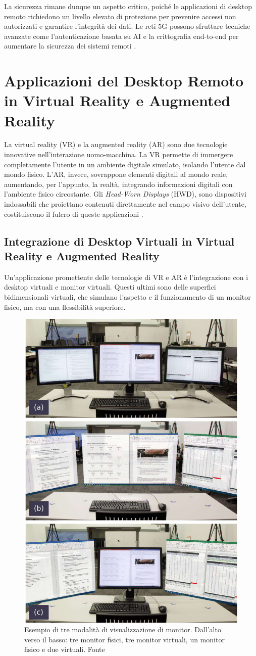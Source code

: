 \documentclass[12pt,a4paper,openright,twoside]{book}
\begin{document}
La sicurezza rimane dunque un aspetto critico, poiché le applicazioni di desktop remoto richiedono un livello elevato di protezione per prevenire accessi non autorizzati e garantire l'integrità dei dati. Le reti 5G possono sfruttare tecniche avanzate come l'autenticazione basata su AI e la crittografia end-to-end per aumentare la sicurezza dei sistemi remoti \cite{Sahu2024}.


\section{Applicazioni del Desktop Remoto in Virtual Reality e Augmented Reality}

La virtual reality (VR) e la augmented reality (AR) sono due tecnologie innovative nell'interazione uomo-macchina. La VR permette di immergere completamente l'utente in un ambiente digitale simulato, isolando l'utente dal mondo fisico. L'AR, invece, sovrappone elementi digitali al mondo reale, aumentando, per l'appunto, la realtà, integrando informazioni digitali con l'ambiente fisico circostante. Gli \textit{Head-Worn Displays} (HWD), sono dispositivi indossabili che proiettano contenuti direttamente nel campo visivo dell'utente, costituiscono il fulcro di queste applicazioni \cite{pavanatto2021, frontiers2023}.

\subsection{Integrazione di Desktop Virtuali in Virtual Reality e Augmented Reality}

Un'applicazione promettente delle tecnologie di VR e AR è l'integrazione con i desktop virtuali e monitor virtuali. Questi ultimi sono delle superfici bidimensionali virtuali, che simulano l'aspetto e il funzionamento di un monitor fisico, ma con una flessibilità superiore\cite{pavanatto2021, frontiers2023}.
\begin{figure}
    \centering
    \includegraphics[width=.4\linewidth]{figures/virtual_monitors.jpg}
    \caption[xarch]{Esempio di tre modalità di visualizzazione di monitor. Dall'alto verso il basso: tre monitor fisici, tre monitor virtuali, un monitor fisico e due virtuali. Fonte \cite{pavanatto2021}}
\end{figure}
\end{document}
